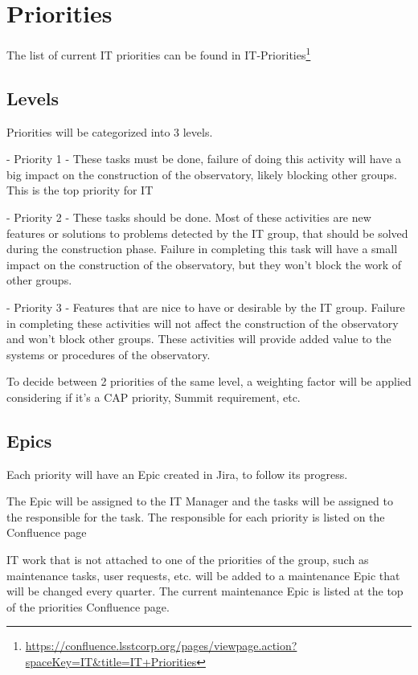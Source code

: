 \section{Priorities}


The list of current IT priorities can be found in IT-Priorities\footnote{\url{https://confluence.lsstcorp.org/pages/viewpage.action?spaceKey=IT&title=IT+Priorities}}

\subsection{Levels }

Priorities will be categorized into 3 levels.

  - Priority 1 - These tasks must be done, failure of doing this activity will have a big impact on the construction of the observatory, likely blocking other groups. This is the top priority for IT

  - Priority 2 - These tasks should be done. Most of these activities are new features or solutions to problems detected by the IT group, that should be solved during the construction phase. Failure in completing this task will have a small impact on the construction of the observatory, but they won't block the work of other groups.

  - Priority 3 - Features that are nice to have or desirable by the IT group. Failure in completing these activities will not affect the construction of the observatory and won't block other groups. These activities will provide added value to the systems or procedures of the observatory.

To decide between 2 priorities of the same level, a weighting factor will be applied considering if it's a CAP priority, Summit requirement, etc.

\subsection{Epics }

Each priority will have an Epic created in Jira, to follow its progress.

The Epic will be assigned to the IT Manager and the tasks will be assigned to the responsible for the task. The responsible for each priority is listed on the Confluence page

IT work that is not attached to one of the priorities of the group, such as maintenance tasks, user requests, etc. will be added to a maintenance Epic that will be changed every quarter. The current maintenance Epic is listed at the top of the priorities Confluence page.

